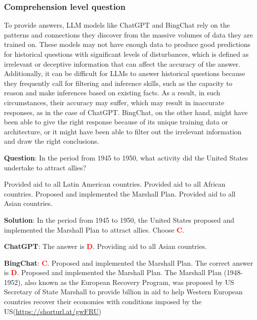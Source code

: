 \documentclass{article}
\begin{document}
{\begin{mdframed}[linewidth=1pt,linecolor=red]
	\end{mdframed}	
	
	\subsubsection{Comprehension level question}
	\label{VNHSGE_His_C}
	
	To provide answers, LLM models like ChatGPT and BingChat rely on the patterns and connections they discover from the massive volumes of data they are trained on. These models may not have enough data to produce good predictions for historical questions with significant levels of disturbances, which is defined as irrelevant or deceptive information that can affect the accuracy of the answer. Additionally, it can be difficult for LLMs to answer historical questions because they frequently call for filtering and inference skills, such as the capacity to reason and make inferences based on existing facts. As a result, in such circumstances, their accuracy may suffer, which may result in inaccurate responses, as in the case of ChatGPT.  BingChat, on the other hand, might have been able to give the right response because of its unique training data or architecture, or it might have been able to filter out the irrelevant information and draw the right conclusions.
	
	
	
	\begin{mdframed}[linewidth=1pt,linecolor=red] \textbf{Question}: In the period from 1945 to 1950, what activity did the United States undertake to attract allies?
		
		\begin{choices}
			\choice Provided aid to all Latin American countries.
			\choice Provided aid to all African countries.
			\choice Proposed and implemented the Marshall Plan.
			\choice Provided aid to all Asian countries.
		\end{choices}
		
		\textbf{Solution}: In the period from 1945 to 1950, the United States proposed and implemented the Marshall Plan to attract allies. Choose \textcolor{red}{\textbf{C}}.
		
		\textbf{ChatGPT}: The answer is \textcolor{red}{\textbf{D}}. Providing aid to all Asian countries.
		
		\textbf{BingChat}: \textcolor{red}{\textbf{C}}. Proposed and implemented the Marshall Plan.
		The correct answer is \textcolor{red}{\textbf{D}}. Proposed and implemented the Marshall Plan. The Marshall Plan (1948-1952), also known as the European Recovery Program, was proposed by US Secretary of State Marshall to provide  billion in aid to help Western European countries recover their economies with conditions imposed by the US(\url{https://shorturl.at/gwFRU})
		

\end{mdframed}}
\end{document}
